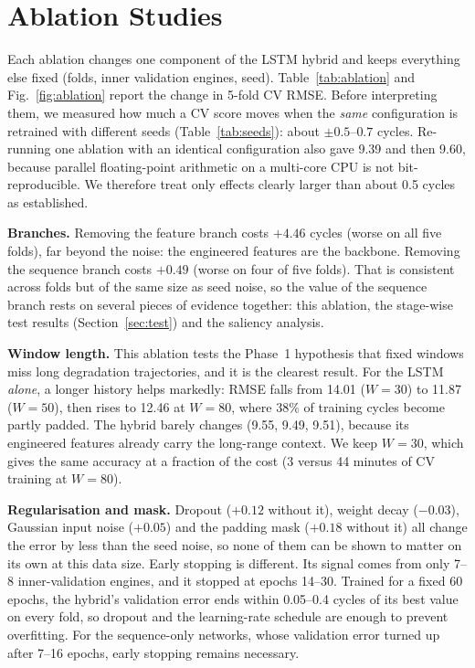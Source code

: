 \section{Ablation Studies}\label{sec:ablation}
Each ablation changes one component of the LSTM hybrid and keeps everything else fixed (folds, inner validation engines, seed). Table~\ref{tab:ablation} and Fig.~\ref{fig:ablation} report the change in 5-fold CV RMSE. Before interpreting them, we measured how much a CV score moves when the \emph{same} configuration is retrained with different seeds (Table~\ref{tab:seeds}): about $\pm0.5$--$0.7$ cycles. Re-running one ablation with an identical configuration also gave 9.39 and then 9.60, because parallel floating-point arithmetic on a multi-core CPU is not bit-reproducible. We therefore treat only effects clearly larger than about 0.5 cycles as established.

\textbf{Branches.} Removing the feature branch costs $+4.46$ cycles (worse on all five folds), far beyond the noise: the engineered features are the backbone. Removing the sequence branch costs $+0.49$ (worse on four of five folds). That is consistent across folds but of the same size as seed noise, so the value of the sequence branch rests on several pieces of evidence together: this ablation, the stage-wise test results (Section~\ref{sec:test}) and the saliency analysis.

\textbf{Window length.} This ablation tests the Phase~1 hypothesis that fixed windows miss long degradation trajectories, and it is the clearest result. For the LSTM \emph{alone}, a longer history helps markedly: RMSE falls from 14.01 ($W=30$) to 11.87 ($W=50$), then rises to 12.46 at $W=80$, where 38\% of training cycles become partly padded. The hybrid barely changes (9.55, 9.49, 9.51), because its engineered features already carry the long-range context. We keep $W=30$, which gives the same accuracy at a fraction of the cost (3 versus 44 minutes of CV training at $W=80$).

\textbf{Regularisation and mask.} Dropout ($+0.12$ without it), weight decay ($-0.03$), Gaussian input noise ($+0.05$) and the padding mask ($+0.18$ without it) all change the error by less than the seed noise, so none of them can be shown to matter on its own at this data size. Early stopping is different. Its signal comes from only 7--8 inner-validation engines, and it stopped at epochs 14--30. Trained for a fixed 60 epochs, the hybrid's validation error ends within 0.05--0.4 cycles of its best value on every fold, so dropout and the learning-rate schedule are enough to prevent overfitting. For the sequence-only networks, whose validation error turned up after 7--16 epochs, early stopping remains necessary.

